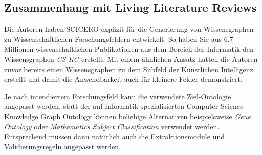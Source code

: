 \subsection{Zusammenhang mit Living Literature Reviews}

Die Autoren haben SCICERO explizit für die Generierung von Wissensgraphen zu Wissenschaftlichen Forschungsfeldern entwickelt.
So haben Sie aus 6.7 Millionen wissenschaftlichen Publikationen aus dem Bereich der Informatik den Wissensgraphen \textit{CS-KG} \cite{cskg} erstellt.
Mit einem ähnlichen Ansatz hatten die Autoren zuvor bereits einen Wissensgraphen zu dem Subfeld der Künstlichen Intelligenz erstellt \cite{aikg} und damit die Anwendbarkeit auch für kleinere Felder demonstriert.

Je nach intendiertem Forschungsfeld kann die verwendete Ziel-Ontologie angepasst werden, statt der auf Informatik spezialisierten Computer Science Knowledge Graph Ontology können beliebige Alternativen \textemdash beispielsweise \textit{Gene Ontology} oder \textit{Mathematics Subject
    Classification} \cite{DESSI2022109945} \textemdash verwendet werden.
Entsprechend müssen dann natürlich auch die Extraktionsmodule und Validierungsregeln angepasst werden.

